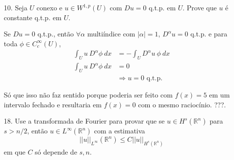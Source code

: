 \documentclass[11pt]{article}
\newcommand{\Rn}{{\mathbb{R}^n}}
\begin{document}
\begin{enumerate}
	\item[10.]\label{ex:U-conexo_u-constante} Seja $U$ conexo e $u \in W^{1,p}(U)$ com $Du=0$ q.t.p. em $U$. Prove que $u$ é constante q.t.p. em $U$.
	
	Se $Du=0$ q.t.p., então $\forall\alpha$ multiíndice com $|\alpha|=1$, $D^\alpha u =0$ q.t.p. e para toda $\phi\in C^\infty_c(U)$,\begin{align*}
		\int_U u\ D^\alpha \phi\ dx &= - \int_U D^\alpha u \ \phi \ dx \\
		\int_U u\ D^\alpha \phi\ dx &= 0\\
		&\Rightarrow u =0 \text{ q.t.p. }
	\end{align*}

	Só que isso não faz sentido porque poderia ser feito com $f(x)=5$ em um intervalo fechado e resultaria em $f(x)=0$ com o mesmo raciocínio. ???.

	\item[18.] Use a transformada de Fourier para provar que se $u \in H^s(\Rn)$ para $s> n/2$, então $u \in L^{\infty}(\Rn)$ com a estimativa \[ ||u||_{L^\infty}(\Rn) \leq C ||u||_{H^s(\Rn)} \] em que $C$ só depende de $s,n$.
\end{enumerate}
\end{document}
